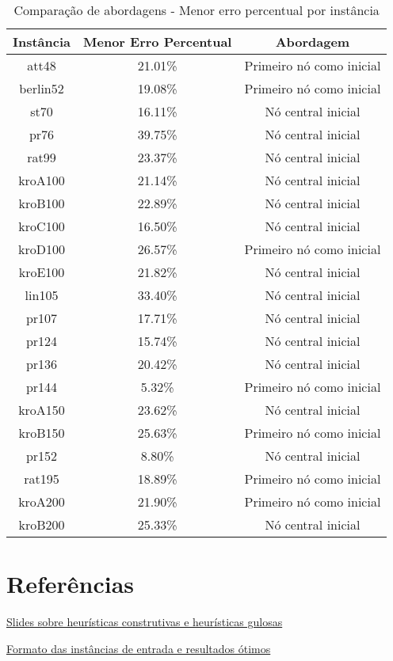 \documentclass[10pt]{extarticle} %
\begin{document}
\begin{table}[h]
\centering
\begin{tabular}{|c|c|c|} \hline
\textbf{Instância} & \textbf{Menor Erro Percentual} & \textbf{Abordagem} \\ \hline
    att48       & 21.01\%   & Primeiro nó como inicial \\ \hline
    berlin52    & 19.08\%   & Primeiro nó como inicial \\ \hline
    st70        & 16.11\%   & Nó central inicial       \\ \hline
    pr76        & 39.75\%   & Nó central inicial       \\ \hline
    rat99       & 23.37\%   & Nó central inicial       \\ \hline
    kroA100     & 21.14\%   & Nó central inicial       \\ \hline
    kroB100     & 22.89\%   & Nó central inicial       \\ \hline
    kroC100     & 16.50\%   & Nó central inicial       \\ \hline
    kroD100     & 26.57\%   & Primeiro nó como inicial \\ \hline
    kroE100     & 21.82\%   & Nó central inicial       \\ \hline
    lin105      & 33.40\%   & Nó central inicial       \\ \hline
    pr107       & 17.71\%   & Nó central inicial       \\ \hline
    pr124       & 15.74\%   & Nó central inicial       \\ \hline
    pr136       & 20.42\%   & Nó central inicial       \\ \hline
    pr144       & 5.32\%    & Primeiro nó como inicial \\ \hline
    kroA150     & 23.62\%   & Nó central inicial       \\ \hline
    kroB150     & 25.63\%   & Primeiro nó como inicial \\ \hline
    pr152       & 8.80\%    & Nó central inicial       \\ \hline
    rat195      & 18.89\%   & Primeiro nó como inicial \\ \hline
    kroA200     & 21.90\%   & Primeiro nó como inicial \\ \hline
    kroB200     & 25.33\%   & Nó central inicial       \\ \hline
\end{tabular}
\caption{Comparação de abordagens - Menor erro percentual por instância}
\label{tab:comparison}
\end{table}


\section{Referências}

\noindent \href{http://www.decom.ufop.br/prof/marcone/Disciplinas/InteligenciaComputacional/HeuristicasConstrutivas.pdf}{Slides sobre heurísticas construtivas e heurísticas gulosas}

\noindent \href{http://comopt.ifi.uni-heidelberg.de/software/TSPLIB95/}{Formato das instâncias de entrada e resultados ótimos}
\end{document}
